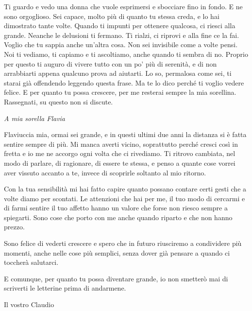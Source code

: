 Ti guardo e vedo una donna che vuole esprimersi e sbocciare fino in fondo. E ne sono orgoglioso. Sei capace, molto più di quanto tu stessa creda, e lo hai dimostrato tante volte. Quando ti impunti per ottenere qualcosa, ci riesci alla grande. Neanche le delusioni ti fermano. Ti rialzi, ci riprovi e alla fine ce la fai. Voglio che tu sappia anche un'altra cosa. Non sei invisibile come a volte pensi. Noi ti vediamo, ti capiamo e ti ascoltiamo, anche quando ti sembra di no. Proprio per questo ti auguro di vivere tutto con un po' più di serenità, e di non arrabbiarti appena qualcuno prova ad aiutarti. Lo so, permalosa come sei, ti starai già offendendo leggendo questa frase. Ma te lo dico perché ti voglio vedere felice. E per quanto tu possa crescere, per me resterai sempre la mia sorellina. Rassegnati, su questo non si discute.\par

\vspace{5mm}
\textit{A mia sorella Flavia}\par
\vspace{2mm}
Flaviuccia mia, ormai sei grande, e in questi ultimi due anni la distanza si è fatta sentire sempre di più. Mi manca averti vicino, soprattutto perché cresci così in fretta e io me ne accorgo ogni volta che ci rivediamo. Ti ritrovo cambiata, nel modo di parlare, di ragionare, di essere te stessa, e penso a quante cose vorrei aver vissuto accanto a te, invece di scoprirle soltanto al mio ritorno.\par

Con la tua sensibilità mi hai fatto capire quanto possano contare certi gesti che a volte diamo per scontati. Le attenzioni che hai per me, il tuo modo di cercarmi e di farmi sentire il tuo affetto hanno un valore che forse non riesco sempre a spiegarti. Sono cose che porto con me anche quando riparto e che non hanno prezzo.\par

Sono felice di vederti crescere e spero che in futuro riusciremo a condividere più momenti, anche nelle cose più semplici, senza dover già pensare a quando ci toccherà salutarci.\par

E comunque, per quanto tu possa diventare grande, io non smetterò mai di scriverti le letterine prima di andarmene.\par

\vfill
\begin{flushright}
    Il vostro Claudio
\end{flushright}



